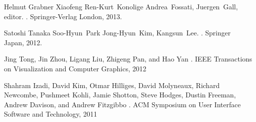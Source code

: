 \begin{thebibliography}{1}

Helmut Grabner Xiaofeng Ren-Kurt~Konolige Andrea~Fossati, Juergen~Gall, editor.
.
\newblock Springer-Verlag London, 2013.

Satoshi Tanaka Soo-Hyun~Park Jong-Hyun~Kim, Kangsun~Lee.
.
\newblock Springer Japan, 2012.

Jing Tong, Jin Zhou, Ligang Liu, Zhigeng Pan, and Hao Yan
.
\newblock IEEE Transactions on Visualization and Computer Graphics, 2012

Shahram Izadi, David Kim, Otmar Hilliges, David Molyneaux, Richard Newcombe, Pushmeet Kohli, Jamie Shotton, Steve Hodges, Dustin Freeman, Andrew Davison, and Andrew Fitzgibbo
.
\newblock ACM Symposium on User Interface Software and Technology, 2011

\end{thebibliography}
